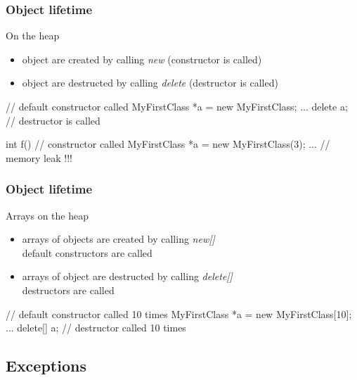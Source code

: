 \begin{frame}[fragile]
  \frametitle{Object lifetime}
  \begin{block}{On the heap}
    \begin{itemize}
    \item object are created by calling {\it new} (constructor is called)
    \item object are destructed by calling {\it delete} (destructor is called)
    \end{itemize}
  \end{block}
  \begin{cppcode}
    {
      // default constructor called
      MyFirstClass *a = new MyFirstClass;
      ...
      delete a; // destructor is called
    }

    int f() {
      // constructor called
      MyFirstClass *a = new MyFirstClass(3);
      ...
    } // memory leak !!!
  \end{cppcode}
\end{frame}

\begin{frame}[fragile]
  \frametitle{Object lifetime}
  \begin{block}{Arrays on the heap}
    \begin{itemize}
    \item arrays of objects are created by calling {\it new[]} \\
      default constructors are called
    \item arrays of object are destructed by calling {\it delete[]} \\
      destructors are called
    \end{itemize}
  \end{block}
  \begin{cppcode}
    {
      // default constructor called 10 times
      MyFirstClass *a = new MyFirstClass[10];
      ...
      delete[] a; // destructor called 10 times
    }
  \end{cppcode}
\end{frame}


\subsection{Exceptions}

